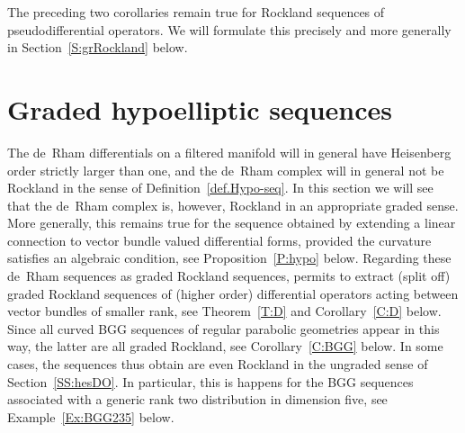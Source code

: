 \documentclass[reqno,12pt]{amsart}
\theoremstyle{plain}
\theoremstyle{definition}
\begin{document}
The preceding two corollaries remain true for Rockland sequences of pseudodifferential operators.
We will formulate this precisely and more generally in Section~\ref{S:grRockland} below.











\section{Graded hypoelliptic sequences}\label{S:grhesequences}












The de~Rham differentials on a filtered manifold will in general have Heisenberg order strictly larger than one, and the de~Rham complex will in general not be Rockland in the sense of Definition~\ref{def.Hypo-seq}.
In this section we will see that the de~Rham complex is, however, Rockland in an appropriate graded sense.
More generally, this remains true for the sequence obtained by extending a linear connection to vector bundle valued differential forms, provided the curvature satisfies an algebraic condition, see Proposition~\ref{P:hypo} below.
Regarding these de~Rham sequences as graded Rockland sequences, permits to extract (split off) graded Rockland sequences of (higher order) differential operators acting between vector bundles of smaller rank, see Theorem~\ref{T:D} and Corollary~\ref{C:D} below.
Since all curved BGG sequences \cite{CSS01,CD01} of regular parabolic geometries appear in this way, the latter are all graded Rockland, see Corollary~\ref{C:BGG} below.
In some cases, the sequences thus obtain are even Rockland in the ungraded sense of Section~\ref{SS:hesDO}.
In particular, this is happens for the BGG sequences associated with a generic rank two distribution in dimension five, see Example~\ref{Ex:BGG235} below.
\end{document}
